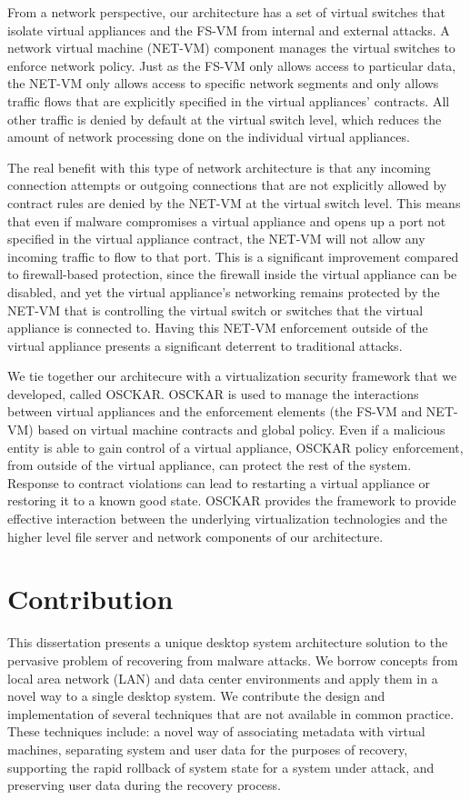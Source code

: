 From a network perspective, our architecture has a set of virtual switches that isolate virtual appliances and the FS-VM from internal and external attacks. A network virtual machine (NET-VM) component manages the virtual switches to enforce network policy. Just as the FS-VM only allows access to particular data, the NET-VM only allows access to specific network segments and only allows traffic flows that are explicitly specified in the virtual appliances' contracts. All other traffic is denied by default at the virtual switch level, which reduces the amount of network processing done on the individual virtual appliances.

The real benefit with this type of network architecture is that any incoming connection attempts or outgoing connections that are not explicitly allowed by contract rules are denied by the NET-VM at the virtual switch level. This means that even if malware compromises a virtual appliance and opens up a port not specified in the virtual appliance contract, the NET-VM will not allow any incoming traffic to flow to that port. This is a significant improvement compared to firewall-based protection, since the firewall inside the virtual appliance can be disabled, and yet the virtual appliance's networking remains protected by the NET-VM that is controlling the virtual switch or switches that the virtual appliance is connected to. Having this NET-VM enforcement outside of the virtual appliance presents a significant deterrent to traditional attacks. 

We tie together our architecure with a virtualization security framework that we developed, called OSCKAR. OSCKAR is used to manage the interactions between virtual appliances and the enforcement elements (the FS-VM and NET-VM) based on virtual machine contracts and global policy. Even if a malicious entity is able to gain control of a virtual appliance, OSCKAR policy enforcement, from outside of the virtual appliance, can protect the rest of the system. Response to contract violations can lead to restarting a virtual appliance or restoring it to a known good state. OSCKAR provides the framework to provide effective interaction between the underlying virtualization technologies and the higher level file server and network components of our architecture.

\section{Contribution}

This dissertation presents a unique desktop system architecture solution to the pervasive problem of recovering from malware attacks. We borrow concepts from local area network (LAN) and data center environments and apply them in a novel way to a single desktop system. We contribute the design and implementation of several techniques that are not available in common practice. These techniques include: a novel way of associating metadata with virtual machines, separating system and user data for the purposes of recovery, supporting the rapid rollback of system state for a system under attack, and preserving user data during the recovery process.

